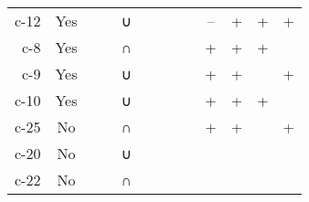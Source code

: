 \begin{tabular}[pos]{ | r | c | c | c | c | c | c | c | c | c | c | c | c | }
\hline
{\mktsStyleBold{}c-12} & Yes & \cjkgGlue{\cjk{}\cjkgGlue{\cnjzr{}}\cjkgGlue{}}\cjkgGlue{} & \cjkgGlue{\cjk{}\cjkgGlue{\cnjzr{}}\cjkgGlue{}}\cjkgGlue{} & {\mktsRsgFb{}∪} &  & \cjkgGlue{\cjk{}\cjkgGlue{\cnjzr{}}\cjkgGlue{}}\cjkgGlue{} & \cjkgGlue{\cjk{}\cjkgGlue{\cnjzr{}}\cjkgGlue{}}\cjkgGlue{} & \cjkgGlue{\cjk{}\cjkgGlue{\cnjzr{}}\cjkgGlue{}}\cjkgGlue{} & – & + & + & +\\
{\mktsStyleBold{}c-8} & Yes & \cjkgGlue{\cjk{}\cjkgGlue{\cnjzr{}}\cjkgGlue{}}\cjkgGlue{} & \cjkgGlue{\cjk{}\cjkgGlue{\cnjzr{}}\cjkgGlue{}}\cjkgGlue{} & {\mktsRsgFb{}∩} & \cjkgGlue{\cjk{}\cjkgGlue{\cnjzr{}}\cjkgGlue{}}\cjkgGlue{} & \cjkgGlue{\cjk{}\cjkgGlue{\cnjzr{}}\cjkgGlue{}}\cjkgGlue{} & \cjkgGlue{\cjk{}\cjkgGlue{\cnjzr{}}\cjkgGlue{}}\cjkgGlue{} &  & + & + & + & \\
{\mktsStyleBold{}c-9} & Yes & \cjkgGlue{\cjk{}\cjkgGlue{\cnjzr{}}\cjkgGlue{}}\cjkgGlue{} & \cjkgGlue{\cjk{}\cjkgGlue{\cnjzr{}}\cjkgGlue{}}\cjkgGlue{} & {\mktsRsgFb{}∪} & \cjkgGlue{\cjk{}\cjkgGlue{\cnjzr{}}\cjkgGlue{}}\cjkgGlue{} & \cjkgGlue{\cjk{}\cjkgGlue{\cnjzr{}}\cjkgGlue{}}\cjkgGlue{} &  & \cjkgGlue{\cjk{}\cjkgGlue{\cnjzr{}}\cjkgGlue{}}\cjkgGlue{} & + & + &  & +\\
{\mktsStyleBold{}c-10} & Yes & \cjkgGlue{\cjk{}\cjkgGlue{\cnjzr{}}\cjkgGlue{}}\cjkgGlue{} & \cjkgGlue{\cjk{}\cjkgGlue{\cnjzr{}}\cjkgGlue{}}\cjkgGlue{} & {\mktsRsgFb{}∪} & \cjkgGlue{\cjk{}\cjkgGlue{\cnjzr{}}\cjkgGlue{}}\cjkgGlue{} & \cjkgGlue{\cjk{}\cjkgGlue{\cnjzr{}}\cjkgGlue{}}\cjkgGlue{} & \cjkgGlue{\cjk{}\cjkgGlue{\cnjzr{}}\cjkgGlue{}}\cjkgGlue{} &  & + & + & + & \\
{\mktsStyleBold{}c-25} & No & \cjkgGlue{\cjk{}\cjkgGlue{\cnjzr{}}\cjkgGlue{}}\cjkgGlue{} & \cjkgGlue{\cjk{}\cjkgGlue{\cnjzr{}}\cjkgGlue{}}\cjkgGlue{} & {\mktsRsgFb{}∩} & \cjkgGlue{\cjk{}\cjkgGlue{\cnjzr{}}\cjkgGlue{}}\cjkgGlue{} & \cjkgGlue{\cjk{}\cjkgGlue{\cnjzr{}}\cjkgGlue{}}\cjkgGlue{} &  & \cjkgGlue{\cjk{}\cjkgGlue{\cnjzr{}}\cjkgGlue{}}\cjkgGlue{} & + & + &  & +\\
{\mktsStyleBold{}c-20} & No & \cjkgGlue{\cjk{}\cjkgGlue{\cnjzr{}}\cjkgGlue{}}\cjkgGlue{} & \cjkgGlue{\cjk{}\cjkgGlue{\cnjzr{}}\cjkgGlue{}}\cjkgGlue{} & {\mktsRsgFb{}∪} & \cjkgGlue{\cjk{}\cjkgGlue{\cnjzr{}}\cjkgGlue{}}\cjkgGlue{} &  & \cjkgGlue{\cjk{}\cjkgGlue{\cnjzr{}}\cjkgGlue{}}\cjkgGlue{} & \cjkgGlue{\cjk{}\cjkgGlue{\cnjzr{}}\cjkgGlue{}}\cjkgGlue{} &  &  &  & \\
{\mktsStyleBold{}c-22} & No & \cjkgGlue{\cjk{}\cjkgGlue{\cnjzr{}}\cjkgGlue{}}\cjkgGlue{} & \cjkgGlue{\cjk{}\cjkgGlue{\cnjzr{}}\cjkgGlue{}}\cjkgGlue{} & {\mktsRsgFb{}∩} &  & \cjkgGlue{\cjk{}\cjkgGlue{\cnjzr{}}\cjkgGlue{}}\cjkgGlue{} & \cjkgGlue{\cjk{}\cjkgGlue{\cnjzr{}}\cjkgGlue{}}\cjkgGlue{} & \cjkgGlue{\cjk{}\cjkgGlue{\cnjzr{}}\cjkgGlue{}}\cjkgGlue{} &  &  &  & \\

\end{tabular}

